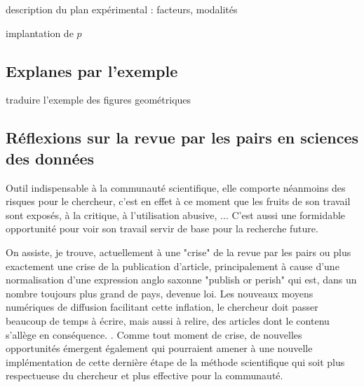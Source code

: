 description du plan expérimental : facteurs, modalités

implantation de $p$


\subsection{Explanes par l'exemple}

traduire l'exemple des figures geométriques


\subsection{Réflexions sur la revue par les pairs en sciences des données}

Outil indispensable à la communauté scientifique, elle comporte néanmoins des risques pour le chercheur, c'est en effet à ce moment que les fruits de son travail sont exposés, à la critique, à l'utilisation abusive, ... C'est aussi une formidable opportunité pour voir son travail servir de base pour la recherche future.

On assiste, je trouve, actuellement à une "crise" de la revue par les pairs ou plus exactement une crise de la publication d'article, principalement à cause d'une normalisation d'une expression anglo saxonne "publish or perish" qui est, dans un nombre toujours plus grand de pays, devenue loi. Les nouveaux moyens numériques de diffusion facilitant cette inflation, le chercheur doit passer beaucoup de temps à écrire, mais aussi à relire, des articles dont le contenu s'allège en conséquence. . Comme tout moment de crise, de nouvelles opportunités émergent également qui pourraient amener à une nouvelle implémentation de cette dernière étape de la méthode scientifique qui soit plus respectueuse du chercheur et plus effective pour la communauté. 

